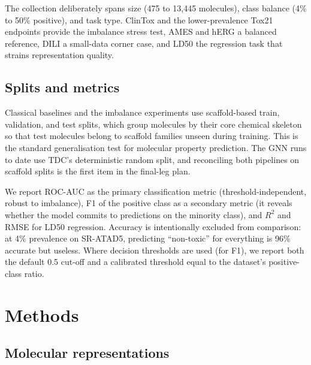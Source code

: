 \documentclass[a4paper,11pt]{article}
\begin{document}
The collection deliberately spans size (475 to 13{,}445 molecules), class balance (4\% to 50\% positive), and task type. ClinTox and the lower-prevalence Tox21 endpoints provide the imbalance stress test, AMES and hERG a balanced reference, DILI a small-data corner case, and LD50 the regression task that strains representation quality.

\subsection{Splits and metrics}

Classical baselines and the imbalance experiments use scaffold-based train, validation, and test splits, which group molecules by their core chemical skeleton so that test molecules belong to scaffold families unseen during training. This is the standard generalisation test for molecular property prediction. The GNN runs to date use TDC's deterministic random split, and reconciling both pipelines on scaffold splits is the first item in the final-leg plan.

We report ROC-AUC as the primary classification metric (threshold-independent, robust to imbalance), F1 of the positive class as a secondary metric (it reveals whether the model commits to predictions on the minority class), and $R^2$ and RMSE for LD50 regression. Accuracy is intentionally excluded from comparison: at 4\% prevalence on SR-ATAD5, predicting ``non-toxic'' for everything is 96\% accurate but useless. Where decision thresholds are used (for F1), we report both the default 0.5 cut-off and a calibrated threshold equal to the dataset's positive-class ratio.

\section{Methods}

\subsection{Molecular representations}
\end{document}
